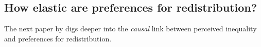 \subsection{How elastic are preferences for redistribution? \citep{kuziemko_how_2015}}
The next paper by \citeauthor{kuziemko_how_2015} digs deeper into the \textit{causal} link between perceived inequality and preferences for redistribution.